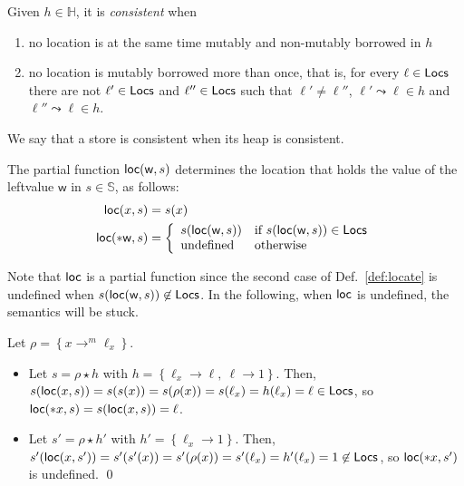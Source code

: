 \begin{definition}
  Given $h\in\mathbb{H}$, it is \emph{consistent} when
  \begin{enumerate}
  \item no location is at the same time mutably and non-mutably borrowed in $h$
  \item no location is mutably borrowed more than once, that is, for every
    $\ell\in\mathsf{Locs}$ there are not $\ell'\in\mathsf{Locs}$ and $\ell''\in\mathsf{Locs}$ such that
    $\ell'\not=\ell''$, $\ell'\leadsto\ell\in h$ and $\ell''\leadsto\ell\in h$.
  \end{enumerate}
  We say that a store is consistent when its heap is consistent.
\end{definition}

\begin{definition}[Locate]\label{def:locate}
  The partial function $\mathsf{loc}(\mathsf{w},s)$ determines the location that holds
  the value of the leftvalue $\mathsf{w}$ in $s\in\mathbb{S}$, as follows:
  \begin{align*}
    \mathsf{loc}(x,s) &= s(x)\\
    \mathsf{loc}(*\mathsf{w},s) &= \left\{\begin{array}{ll}
      s(\mathsf{loc}(\mathsf{w},s)) & \text{if } s(\mathsf{loc}(\mathsf{w},s)) \in \mathsf{Locs}\\
      \text{undefined} & \text{otherwise}
    \end{array}\right.
  \end{align*}
\end{definition}

\noindent
Note that $\mathsf{loc}$ is a partial function since the second case of
Def.~\ref{def:locate} is undefined when
$s(\mathsf{loc}(\mathsf{w},s))\not\in\mathsf{Locs}$. In the following, when $\mathsf{loc}$ is undefined, the
semantics will be stuck.

\begin{example}
  Let $\rho = \left\{x\rightarrow^m\ell_x\right\}$.
  \begin{itemize}
    \item Let $s = \rho\star h$ with
    $h = \left\{\ell_x\rightarrow\ell,\ \ell\rightarrow 1\right\}$.
    Then, $s(\mathsf{loc}(x,s)) = s(s(x)) = s(\rho(x)) = s(\ell_x) =
    h(\ell_x) = \ell\in\mathsf{Locs}$, so
    $\mathsf{loc}(\mathtt{*}x,s)= s(\mathsf{loc}(x,s)) = \ell$.
    \item Let $s' = \rho\star h'$ with
    $h' = \left\{\ell_x\rightarrow 1\right\}$. Then,
    $s'(\mathsf{loc}(x,s')) = s'(s'(x)) = s'(\rho(x)) = s'(\ell_x) =
    h'(\ell_x) = 1 \not\in\mathsf{Locs}$, so $\mathsf{loc}(\mathtt{*}x,s')$ is undefined.
    \qed
  \end{itemize}
\end{example}

